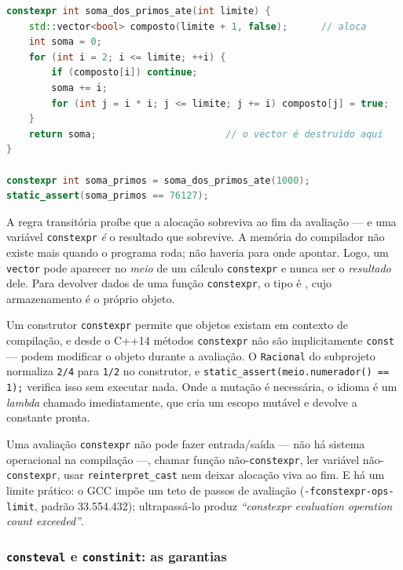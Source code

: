 \begin{lstlisting}[style=bt, language=C++,
    caption={O crivo de Eratóstenes rodando no compilador.}]
constexpr int soma_dos_primos_ate(int limite) {
    std::vector<bool> composto(limite + 1, false);      // aloca
    int soma = 0;
    for (int i = 2; i <= limite; ++i) {
        if (composto[i]) continue;
        soma += i;
        for (int j = i * i; j <= limite; j += i) composto[j] = true;
    }
    return soma;                       // o vector é destruído aqui
}

constexpr int soma_primos = soma_dos_primos_ate(1000);
static_assert(soma_primos == 76127);
\end{lstlisting}

\begin{armadilha}[\texttt{constexpr std::vector<int> v = \{1,2,3\};} não compila]
A regra transitória proíbe que a alocação sobreviva ao fim da avaliação --- e
uma variável \texttt{constexpr} \emph{é} o resultado que sobrevive. A memória do
compilador não existe mais quando o programa roda; não haveria para onde
apontar. Logo, um \texttt{vector} pode aparecer no \emph{meio} de um cálculo
\texttt{constexpr} e nunca ser o \emph{resultado} dele. Para devolver dados de
uma função \texttt{constexpr}, o tipo é , cujo armazenamento
é o próprio objeto.
\end{armadilha}

Um construtor \texttt{constexpr} permite que objetos existam em contexto de
compilação, e desde o C++14 métodos \texttt{constexpr} não são implicitamente
\texttt{const} --- podem modificar o objeto durante a avaliação. O
\texttt{Racional} do subprojeto normaliza \texttt{2/4} para \texttt{1/2} no
construtor, e \texttt{static\_assert(meio.numerador() == 1);} verifica isso sem
executar nada. Onde a mutação é necessária, o idioma é um \emph{lambda} chamado
imediatamente, que cria um escopo mutável e devolve a constante pronta.

Uma avaliação \texttt{constexpr} não pode fazer entrada/saída --- não há sistema
operacional na compilação ---, chamar função não-\texttt{constexpr}, ler
variável não-\texttt{constexpr}, usar \texttt{reinterpret\_cast} nem deixar
alocação viva ao fim. E há um limite prático: o GCC impõe um teto de passos de
avaliação (\texttt{-fconstexpr-ops-limit}, padrão 33.554.432); ultrapassá-lo
produz \emph{``constexpr evaluation operation count exceeded''}.

\subsubsection{\texttt{consteval} e \texttt{constinit}: as garantias}

